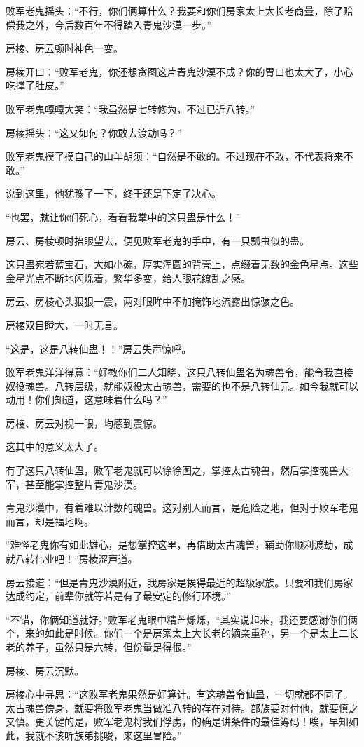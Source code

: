 \begin{this_body}
败军老鬼摇头：“不行，你们俩算什么？我要和你们房家太上大长老商量，除了赔偿我之外，今后数百年不得踏入青鬼沙漠一步。”

房棱、房云顿时神色一变。

房棱开口：“败军老鬼，你还想贪图这片青鬼沙漠不成？你的胃口也太大了，小心吃撑了肚皮。”

败军老鬼嘎嘎大笑：“我虽然是七转修为，不过已近八转。”

房棱摇头：“这又如何？你敢去渡劫吗？”

败军老鬼摸了摸自己的山羊胡须：“自然是不敢的。不过现在不敢，不代表将来不敢。”

说到这里，他犹豫了一下，终于还是下定了决心。

“也罢，就让你们死心，看看我掌中的这只蛊是什么！”

房云、房棱顿时抬眼望去，便见败军老鬼的手中，有一只瓢虫似的蛊。

这只蛊宛若蓝宝石，大如小碗，厚实浑圆的背壳上，点缀着无数的金色星点。这些金星光点不断地闪烁着，繁华多变，给人眼花缭乱之感。

房云、房棱心头狠狠一震，两对眼眸中不加掩饰地流露出惊骇之色。

房棱双目瞪大，一时无言。

“这是，这是八转仙蛊！！”房云失声惊呼。

败军老鬼洋洋得意：“好教你们二人知晓，这只八转仙蛊名为魂兽令，能令我直接奴役魂兽。八转层级，就能奴役太古魂兽，需要的也不是八转仙元。如今我就可以动用！你们知道，这意味着什么吗？”

房棱、房云对视一眼，均感到震惊。

这其中的意义太大了。

有了这只八转仙蛊，败军老鬼就可以徐徐图之，掌控太古魂兽，然后掌控魂兽大军，甚至能掌控整片青鬼沙漠。

青鬼沙漠中，有着难以计数的魂兽。这对别人而言，是危险之地，但对于败军老鬼而言，却是福地啊。

“难怪老鬼你有如此雄心，是想掌控这里，再借助太古魂兽，辅助你顺利渡劫，成就八转伟业吧！”房棱涩声道。

房云接道：“但是青鬼沙漠附近，我房家是挨得最近的超级家族。只要和我们房家达成约定，前辈你就等若是有了最安定的修行环境。”

“不错，你俩知道就好。”败军老鬼眼中精芒烁烁，“其实说起来，我还要感谢你们俩个，来的如此是时候。你们一个是房家太上大长老的嫡亲重孙，另一个是太上二长老的养子，虽然只是六转，但份量足得很。”

房棱、房云沉默。

房棱心中寻思：“这败军老鬼果然是好算计。有这魂兽令仙蛊，一切就都不同了。太古魂兽傍身，就要将败军老鬼当做准八转的存在对待。部族要对付他，就要慎之又慎。更关键的是，败军老鬼将我们俘虏，的确是讲条件的最佳筹码！唉，早知如此，我就不该听族弟挑唆，来这里冒险。”


\end{this_body}
